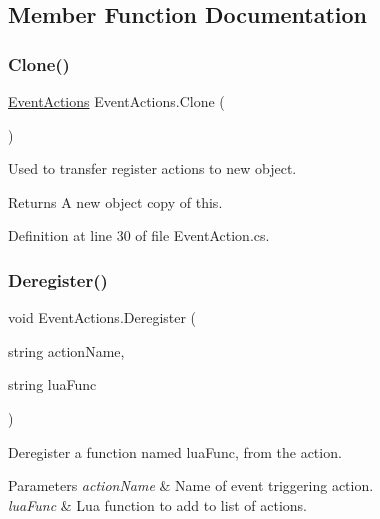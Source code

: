 \subsection{Member Function Documentation}
\mbox{\label{class_event_actions_a47d30ed28e530388cc005a58ba507f4e}} 
\subsubsection{\texorpdfstring{Clone()}{Clone()}}
{\footnotesize\ttfamily \hyperlink{class_event_actions}{Event\+Actions} Event\+Actions.\+Clone (\begin{DoxyParamCaption}{ }\end{DoxyParamCaption})}



Used to transfer register actions to new object. 

\begin{DoxyReturn}{Returns}
A new object copy of this.
\end{DoxyReturn}


Definition at line 30 of file Event\+Action.\+cs.

\mbox{\label{class_event_actions_a1537bfd03582825716502a960ff1b041}} 
\subsubsection{\texorpdfstring{Deregister()}{Deregister()}}
{\footnotesize\ttfamily void Event\+Actions.\+Deregister (\begin{DoxyParamCaption}\item[{string}]{action\+Name,  }\item[{string}]{lua\+Func }\end{DoxyParamCaption})}



Deregister a function named lua\+Func, from the action. 


\begin{DoxyParams}{Parameters}
{\em action\+Name} & Name of event triggering action.\\
\hline
{\em lua\+Func} & Lua function to add to list of actions.\\
\hline
\end{DoxyParams}


